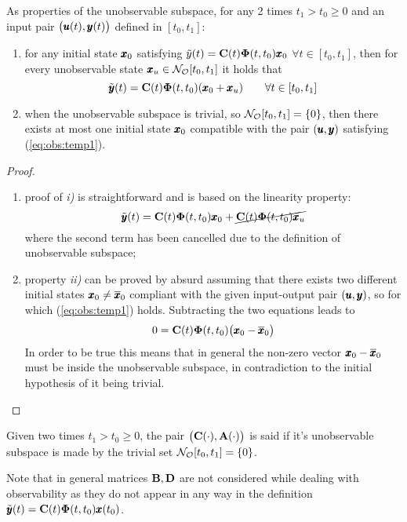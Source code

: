 	As properties of the unobservable subspace, for any 2 times $t_1>t_0\geq 0$ and an input pair $\big(\pmb{u}(t),\pmb{y}(t)\big)$ defined in $[t_0,t_1]$:
	\begin{enumerate}[\itshape i)]
		\item for any initial state $\pmb{x}_0$ satisfying $\tilde y(t) = \mathbf{C}(t) \mathbf{\Phi}(t,t_0)\pmb{x}_0$ $\forall t\in[t_0,t_1]$, then for every unobservable state $\pmb{x}_u \in \mathcal{N_O}[t_0,t_1]$ it holds that
		\begin{equation}
			\tilde {\pmb{y}}(t) = \mathbf{C}(t)\mathbf{\Phi}(t,t_0)(\pmb{x}_0+\pmb{x}_u) \qquad \forall t\in [t_0,t_1]
		\end{equation}
		
		\item when the unobservable subspace is trivial, so $\mathcal{N_O}[t_0,t_1] = \{0\}$, then there exists at most one initial state $\pmb{x}_0$ compatible with the pair $(\pmb{u},\pmb{y})$ satisfying (\ref{eq:obs:temp1}).	
	\end{enumerate}
	\begin{proof}
	\begin{enumerate}[\itshape a)]
		\item proof of \textit{i)} is straightforward and is based on the linearity property:
		\[ \tilde {\pmb{y}}(t) = \mathbf{C}(t)\mathbf{\Phi}(t,t_0)\pmb{x}_0 + \cancel{\mathbf{C}(t)\mathbf{\Phi}(t,t_0)\pmb{x}_u} \]
		where the second term has been cancelled due to the definition of unobservable subspace;
		\item property \textit{ii)} can be proved by absurd assuming that there exists two different  initial states $\pmb{x}_0 \neq \overline {\pmb{x}}_0$  compliant with the given input-output pair $(\pmb{u},\pmb{y})$, so for which (\ref{eq:obs:temp1}) holds. Subtracting the two equations leads to
		\[ 0 = \mathbf{C}(t) \mathbf{\Phi}(t,t_0)\big(\pmb{x}_0-\overline {\pmb{x}}_0\big) \]
		In order to be true this means that in general the non-zero vector $\pmb{x}_0-\overline {\pmb{x}}_0$ must be inside the unobservable subspace, in contradiction to the initial hypothesis of it being trivial.
	\end{enumerate}
	\end{proof}
	
	Given two times $t_1 > t_0\geq 0$, the pair $\big(\mathbf{C}(\cdot),\mathbf{A}(\cdot)\big)$ is said  if it's unobservable subspace is made by the trivial set $\mathcal{N_O}[t_0,t_1] = \{0\}$.
	
	Note that in general matrices $\mathbf{B},\mathbf{D}$ are not considered while dealing with observability as they do not appear in any way in the definition $\tilde {\pmb{y}}(t) = \mathbf{C}(t) \mathbf{\Phi}(t,t_0)\pmb{x}(t_0)$. 
	
